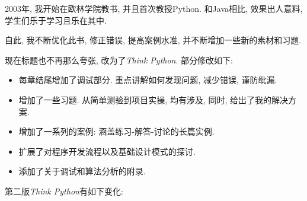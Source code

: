 \documentclass[10pt]{book}
\begin{document}
2003年, 我开始在欧林学院教书, 并且首次教授Python. 
和Java相比, 效果出人意料, 学生们乐于学习且乐在其中. 

%
自此, 我不断优化此书, 修正错误, 提高案例水准, 
并不断增加一些新的素材和习题. 

现在标题也不再那么夸张, 改为了{\em Think Python}. 
部分修改如下:

\begin{itemize}

\item 每章结尾增加了调试部分. 
重点讲解如何发现问题, 减少错误, 谨防纰漏. 

\item 增加了一些习题. 从简单测验到项目实操, 
均有涉及, 同时, 给出了我的解决方案. 

\item 增加了一系列的案例: 涵盖练习-解答-讨论的长篇实例. 

\item 扩展了对程序开发流程以及基础设计模式的探讨. 

\item 添加了关于调试和算法分析的附录. 

\end{itemize}

第二版{\em Think Python}有如下变化: 
\end{document}
